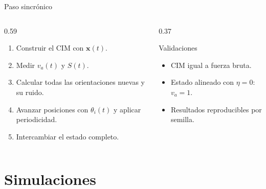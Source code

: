 \documentclass[aspectratio=169,11pt]{beamer}
\begin{document}
\begin{frame}{Paso sincrónico}
  \begin{columns}[T,onlytextwidth]
    \begin{column}{0.59\textwidth}
      \begin{enumerate}
        \item Construir el CIM con $\bm{x}(t)$.
        \item Medir $v_a(t)$ y $S(t)$.
        \item Calcular todas las orientaciones nuevas y su ruido.
        \item Avanzar posiciones con $\theta_i(t)$ y aplicar periodicidad.
        \item Intercambiar el estado completo.
      \end{enumerate}
    \end{column}
    \begin{column}{0.37\textwidth}
      \begin{block}{Validaciones}
        \begin{itemize}
          \item CIM igual a fuerza bruta.
          \item Estado alineado con $\eta=0$: $v_a=1$.
          \item Resultados reproducibles por semilla.
        \end{itemize}
      \end{block}
    \end{column}
  \end{columns}
\end{frame}

\section{Simulaciones}
\begin{frame}
  \sectionpage
\end{frame}
\end{document}
